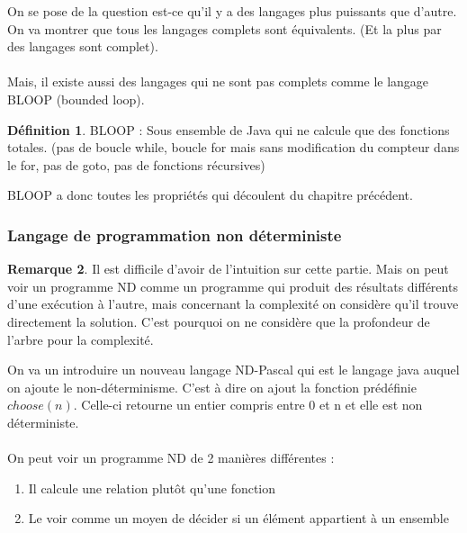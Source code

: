 \documentclass[11pt,a4paper]{article}
\theoremstyle{definition}
\newtheorem{mydef}{Définition}
\newtheorem{myrem}[mydef]{Remarque}
\begin{document}
On se pose de la question est-ce qu'il y a des langages plus puissants que 
d'autre. On va montrer que tous les langages complets sont équivalents. (Et la 
plus par des langages sont complet).

\paragraph{} Mais, il existe aussi des langages qui ne sont pas complets comme le 
langage BLOOP (bounded loop).

\begin{mydef}
	BLOOP : Sous ensemble de Java qui ne calcule que des fonctions totales. 
	(pas de boucle while, boucle for mais sans modification du compteur 
	dans le for, pas de goto, pas de fonctions récursives)
\end{mydef}

BLOOP a donc toutes les propriétés qui découlent du chapitre précédent.


\subsubsection{Langage de programmation non déterministe}
\label{ssub:langague_de_programmation_non_d_terministe}

\begin{myrem}
	Il est difficile d'avoir de l'intuition sur cette partie. Mais on peut 
	voir un programme ND comme un programme qui produit des résultats 
	différents d'une exécution à l'autre, mais concernant la complexité on 
	considère qu'il trouve directement la solution. C'est pourquoi on ne 
	considère que la profondeur de l'arbre pour la complexité.
\end{myrem}

On va un introduire un nouveau langage ND-Pascal qui est le langage java 
auquel on ajoute le non-déterminisme. C'est à dire on ajout la fonction 
prédéfinie $choose(n)$. Celle-ci retourne un entier compris entre 0 et n et elle 
est non déterministe.

\paragraph{} On peut voir un programme ND de 2 manières différentes :

\begin{enumerate}
	\item Il calcule une relation plutôt qu'une fonction
	\item Le voir comme un moyen de décider si un élément appartient à un 
		ensemble
\end{enumerate}
\end{document}
